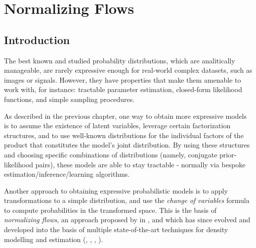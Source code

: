 \chapter{Normalizing Flows}
\label{chapter:probmodel}

\section{Introduction}
The best known and studied probability distributions, which are analitically
manageable, are rarely expressive enough for real-world complex datasets, such
as images or signals. However, they have properties that make them amenable to
work with, for instance: tractable parameter estimation, closed-form likelihood
functions, and simple sampling procedures.

As described in the previous chapter, one way to obtain more expressive models is
to assume the existence of latent variables, leverage certain factorization
structures, and to use well-known distributions for the individual factors of the product that
constitutes the model's joint distribution. By using these structures and choosing
specific combinations of distributions (namely, conjugate prior-likelihood pairs),
these models are able to stay tractable - normally via bespoke estimation/inference/learning
algorithms.

Another approach to obtaining expressive probabilistic models is to apply
transformations to a simple distribution, and use the \emph{change of variables}
formula to compute probabilities in the transformed space. This is the basis
of \emph{normalizing flows}, an approach proposed by \citeauthor{shakir_nf} in \autocite{shakir_nf},
and which has since evolved and developed into the basis of multiple state-of-the-art
techniques for density modelling and estimation (\autocite{Glow}, \autocite{real-nvp}, \autocite{bnaf19},
\autocite{maf}).

